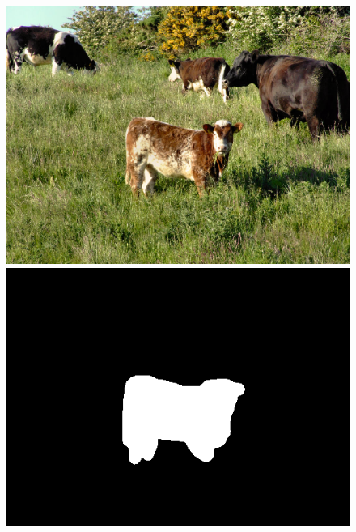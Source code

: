 \documentclass[a4paper, 10pt]{article}
\begin{document}
\begin{figure}
\begin{minipage}{.4\textwidth}
\centering
\includegraphics[scale=0.25]{images/cow.png}
\end{minipage}%
\begin{minipage}{.4\textwidth}
\centering
\includegraphics[scale=0.25]{images/cow-mask.png}
\end{minipage}%
\begin{minipage}{.4\textwidth}
\centering

\end{minipage}
\end{figure}
\end{document}
